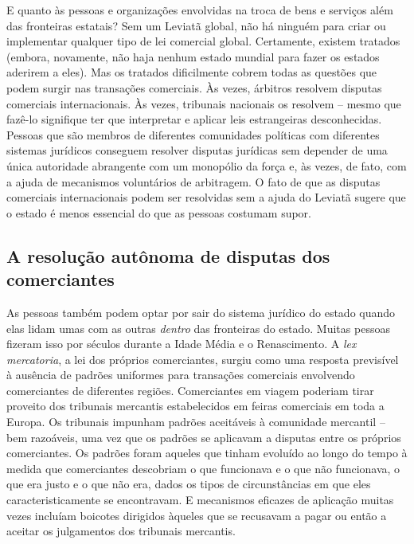 E quanto às pessoas e organizações envolvidas na troca de bens e serviços além das fronteiras estatais? Sem um Leviatã global, não há ninguém para criar ou implementar qualquer tipo de lei comercial global. Certamente, existem tratados (embora, novamente, não haja nenhum estado mundial para fazer os estados aderirem a eles). Mas os tratados dificilmente cobrem todas as questões que podem surgir nas transações comerciais. Às vezes, árbitros resolvem disputas comerciais internacionais. Às vezes, tribunais nacionais os resolvem -- mesmo que fazê-lo signifique ter que interpretar e aplicar leis estrangeiras desconhecidas. Pessoas que são membros de diferentes comunidades políticas com diferentes sistemas jurídicos conseguem resolver disputas jurídicas sem depender de uma única autoridade abrangente com um monopólio da força e, às vezes, de fato, com a ajuda de mecanismos voluntários de arbitragem. O fato de que as disputas comerciais internacionais podem ser resolvidas sem a ajuda do Leviatã sugere que o estado é menos essencial do que as pessoas costumam supor.

\subsection*{A resolução autônoma de disputas dos comerciantes}

As pessoas também podem optar por sair do sistema jurídico do estado quando elas lidam umas com as outras \emph{dentro} das fronteiras do estado. Muitas pessoas fizeram isso por séculos durante a Idade Média e o Renascimento. A \emph{lex mercatoria}, a lei dos próprios comerciantes, surgiu como uma resposta previsível à ausência de padrões uniformes para transações comerciais envolvendo comerciantes de diferentes regiões. Comerciantes em viagem poderiam tirar proveito dos tribunais mercantis estabelecidos em feiras comerciais em toda a Europa. Os tribunais impunham padrões aceitáveis à comunidade mercantil -- bem razoáveis, uma vez que os padrões se aplicavam a disputas entre os próprios comerciantes. Os padrões foram aqueles que tinham evoluído ao longo do tempo à medida que comerciantes descobriam o que funcionava e o que não funcionava, o que era justo e o que não era, dados os tipos de circunstâncias em que eles caracteristicamente se encontravam. E mecanismos eficazes de aplicação muitas vezes incluíam boicotes dirigidos àqueles que se recusavam a pagar ou então a aceitar os julgamentos dos tribunais mercantis.

